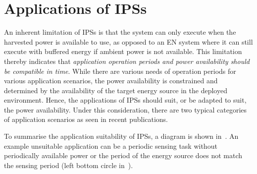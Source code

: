
\section{Applications of IPSs}


An inherent limitation of IPSs is that the system can only execute when the harvested power is available to use, as opposed to an EN system where it can still execute with buffered energy if ambient power is not available. 
This limitation thereby indicates that \textit{application operation periods and power availability should be compatible in time}. 
While there are various needs of operation periods for various application scenarios, the power availability is constrained and determined by the availability of the target energy source in the deployed environment. 
Hence, the applications of IPSs should suit, or be adapted to suit, the power availability. 
Under this consideration, there are two typical categories of application scenarios as seen in recent publications. 

To summarise the application suitability of IPSs, a diagram is shown in~. 
An example unsuitable application can be a periodic sensing task without periodically available power or the period of the energy source does not match the sensing period (left bottom circle in~).

